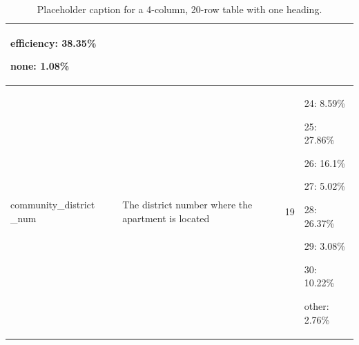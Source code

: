 \documentclass[12pt]{article}
\begin{document}
\begin{table}[H]
\begin{tabular}{|p{3.5cm}|p{5.5cm}|p{2cm}|p{4cm}|}
        efficiency: 38.35\%
        
        none: 1.08\%
        
     \\
    \hline
        community\_district
        \_num & The district number where the apartment is located & 19 & 24: 8.59\%
        
        25: 27.86\%
        
        26: 16.1\%
        
        27: 5.02\%
        
        28: 26.37\%
        
        29: 3.08\%
        
        30: 10.22\%
        
        other: 2.76\%
        
        \\
        \hline
    \end{tabular}
    \caption{Placeholder caption for a 4-column, 20-row table with one heading.}
    \label{tab:placeholder_label}
\end{table}
\end{document}
